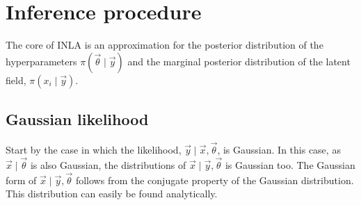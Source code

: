 \documentclass[thesis.tex]{subfiles}
\begin{document}



\section{Inference procedure} \label{transmission:sec:INLA:inference}

The core of INLA is an approximation for the posterior distribution of the hyperparameters $\pi(\vec{\theta} \mid \vec{y})$ and the marginal posterior distribution of the latent field, $\pi(x_i \mid \vec{y})$.

\subsection{Gaussian likelihood}

Start by the case in which the likelihood, $\vec{y} \mid \vec{x}, \vec{\theta}$, is Gaussian.
In this case, as $\vec{x} \mid \vec{\theta}$ is also Gaussian, the distributions of $\vec{x} \mid \vec{y}, \vec{\theta}$ is Gaussian too.
The Gaussian form of $\vec{x} \mid \vec{y}, \vec{\theta}$ follows from the conjugate property of the Gaussian distribution.
This distribution can easily be found analytically.
\end{document}
